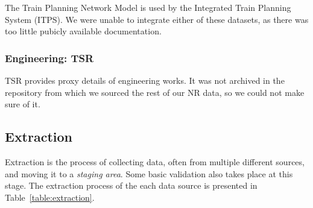 \documentclass[12pt,a4paper]{article}
\begin{document}
The Train Planning Network Model is used by the Integrated Train Planning System (ITPS). We were unable to integrate either of these datasets, as there was too little pubicly available documentation.

\subsubsection{Engineering: TSR}

TSR provides proxy details of engineering works. It was not archived in the repository from which we sourced the rest of our NR data, so we could not make sure of it.

\subsection{Extraction}

Extraction is the process of collecting data, often from multiple different sources, and moving it to a \textit{staging area}. Some basic validation also takes place at this stage. The extraction process of the each data source is presented in Table~\ref{table:extraction}.
\end{document}
